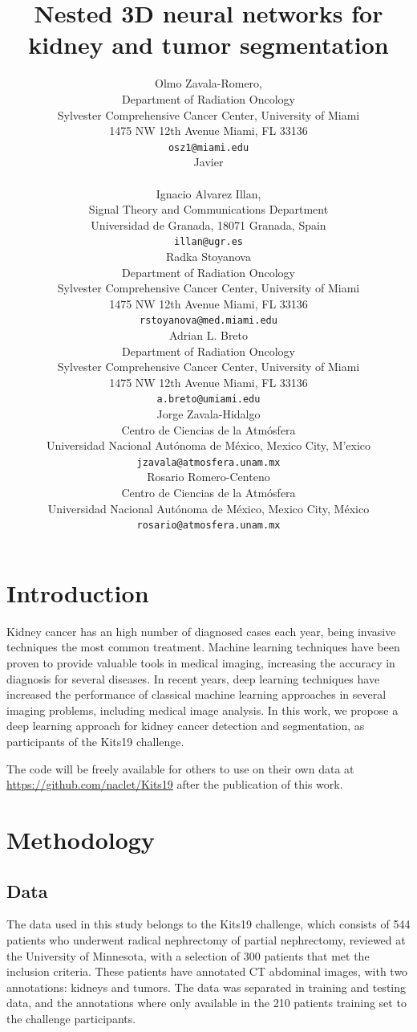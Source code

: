 \documentclass{article}
\title{Nested 3D neural networks for kidney and tumor segmentation}
\author{
  Olmo Zavala-Romero,\\
  Department of Radiation Oncology\\
  Sylvester Comprehensive Cancer Center, University of Miami\\
  1475 NW 12th Avenue Miami, FL 33136\\
  \texttt{osz1@miami.edu} \\
  \And
  Javier \\
  \texttt{} \\
  \AND
  Ignacio Alvarez Illan,\\
  Signal Theory and Communications Department\\
  Universidad de Granada, 18071 Granada, Spain\\
  \texttt{illan@ugr.es} \\
  \AND
  Radka Stoyanova\\
  Department of Radiation Oncology\\
  Sylvester Comprehensive Cancer Center, University of Miami\\
  1475 NW 12th Avenue Miami, FL 33136\\
  \texttt{rstoyanova@med.miami.edu} \\
  \AND
 Adrian L. Breto\\
 Department of Radiation Oncology\\
 Sylvester Comprehensive Cancer Center, University of Miami\\
 1475 NW 12th Avenue
 Miami, FL 33136\\
 \texttt{a.breto@umiami.edu} \\
 \AND
  Jorge Zavala-Hidalgo\\
  Centro de Ciencias de la Atm\'osfera\\
  Universidad Nacional Aut\'onoma de M\'exico, Mexico City, M'exico\\
  \texttt{jzavala@atmosfera.unam.mx} \\
  \AND
  Rosario Romero-Centeno\\
  Centro de Ciencias de la Atm\'osfera\\
  Universidad Nacional Aut\'onoma de M\'exico, Mexico City, M\'exico\\
  \texttt{rosario@atmosfera.unam.mx} \\
}
\begin{document}
\maketitle

\begin{abstract}

\end{abstract}



\section{Introduction}
\label{sec:intro}

Kidney cancer has an high number of diagnosed cases each year, being invasive techniques the most common treatment\cite{sun_treatment_2012}. Machine learning techniques have been proven to provide valuable tools in medical imaging, increasing the accuracy in diagnosis for several diseases\cite{erickson_machine_2017}. In recent years, deep learning techniques have increased the performance of classical machine learning approaches in several imaging problems, including medical image analysis\cite{litjens_survey_2017}. In this work, we propose a deep learning approach for kidney cancer detection and segmentation, as participants of the Kits19 challenge.


The code will be freely available for others to use on their own data at \url{https://github.com/naclet/Kits19} after
the publication of this work. 

\section{Methodology}
\label{sec:methods}

\subsection{Data}
\label{sec:data}

The data used in this study belongs to the Kits19 challenge\cite{heller_kits19_2019}, which consists of 544 patients who underwent radical nephrectomy of partial nephrectomy, reviewed at the University of Minnesota, with a selection of 300 patients that met the inclusion criteria. These patients have annotated CT abdominal images, with two annotations: kidneys and tumors. The data was separated in training and testing data, and the annotations where only available in the 210 patients training set to the challenge participants. 
\end{document}
